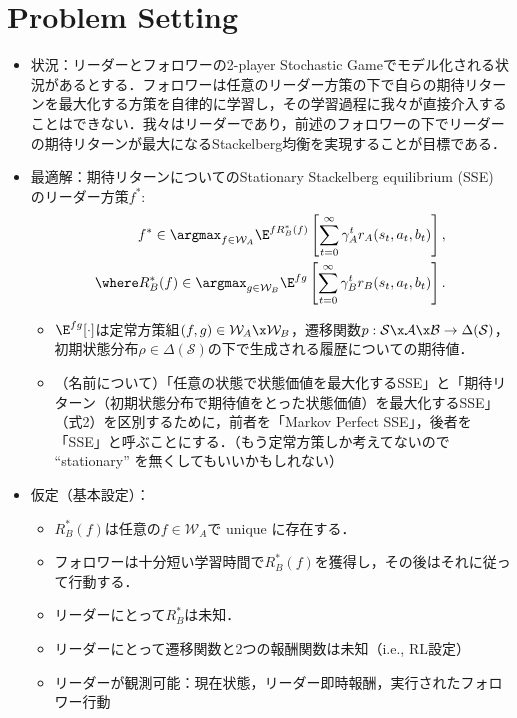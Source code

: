 \documentclass[a4paper,10pt,dvipdfmx]{jsarticle}
\begin{document}
\section{Problem Setting}

\begin{itemize}
    \item 状況：リーダーとフォロワーの2-player Stochastic Gameでモデル化される状況があるとする．フォロワーは任意のリーダー方策の下で自らの期待リターンを最大化する方策を自律的に学習し，その学習過程に我々が直接介入することはできない．我々はリーダーであり，前述のフォロワーの下でリーダーの期待リターンが最大になるStackelberg均衡を実現することが目標である．
    \item 最適解：期待リターンについてのStationary Stackelberg equilibrium (SSE) のリーダー方策$f^*$:
    \begin{align}
        f^*\in\argmax_{f\in\mathcal{W}_A} \E^{fR_B^*(f)}\left[\sum_{t=0}^\infty \gamma_A^tr_A(s_t,a_t,b_t)\right],\\
        \where R_B^*(f)\in\argmax_{g\in\mathcal{W}_B} \E^{fg}\left[\sum_{t=0}^\infty \gamma_B^tr_B(s_t,a_t,b_t)\right].
    \end{align}
    \begin{itemize}
        \item $\E^{fg}[\cdot]$は定常方策組$(f,g)\in\mathcal{W}_A\x\mathcal{W}_B$，遷移関数$p:\mathcal{S}\x\mathcal{A}\x\mathcal{B}\to\Delta(\mathcal{S})$，初期状態分布$\rho\in\Delta(\mathcal{S})$の下で生成される履歴についての期待値．
        \item （名前について）「任意の状態で状態価値を最大化するSSE」と「期待リターン（初期状態分布で期待値をとった状態価値）を最大化するSSE」（式2）を区別するために，前者を「Markov Perfect SSE」，後者を「SSE」と呼ぶことにする．（もう定常方策しか考えてないので ``stationary'' を無くしてもいいかもしれない）
    \end{itemize}
    \item 仮定（基本設定）：
    \begin{itemize}
        \item[1.] $R_B^*(f)$は任意の$f\in\mathcal{W}_A$で unique に存在する．
        \item[2.] フォロワーは十分短い学習時間で$R_B^*(f)$を獲得し，その後はそれに従って行動する．
        \item[3.] リーダーにとって$R_B^*$は未知．
        \item[4.] リーダーにとって遷移関数と2つの報酬関数は未知（i.e., RL設定）
        \item[5.] リーダーが観測可能：現在状態，リーダー即時報酬，実行されたフォロワー行動

\end{itemize}
\end{itemize}
\end{document}
